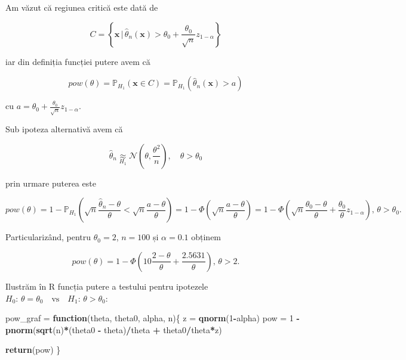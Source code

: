 \documentclass[]{article}
\newenvironment{Shaded}{\begin{snugshade}}{\end{snugshade}}
\newcommand{\KeywordTok}[1]{\textcolor[rgb]{0.13,0.29,0.53}{\textbf{#1}}}
\newcommand{\DecValTok}[1]{\textcolor[rgb]{0.00,0.00,0.81}{#1}}
\newcommand{\StringTok}[1]{\textcolor[rgb]{0.31,0.60,0.02}{#1}}
\newcommand{\ControlFlowTok}[1]{\textcolor[rgb]{0.13,0.29,0.53}{\textbf{#1}}}
\newcommand{\OperatorTok}[1]{\textcolor[rgb]{0.81,0.36,0.00}{\textbf{#1}}}
\newcommand{\NormalTok}[1]{#1}
\begin{document}
Am văzut că regiunea critică este dată de

\[
 C = \left\{\mathbf{x}\,|\,\hat{\theta}_n(\mathbf{x}) > \theta_0 + \frac{\theta_0}{\sqrt{n}}z_{1-\alpha}\right\}
\]

iar din definiția funcției putere avem că

\[
 pow(\theta) = \mathbb{P}_{H_1}(\mathbf{x}\in C) = \mathbb{P}_{H_1}(\hat{\theta}_n(\mathbf{x}) > a)
\]

cu \(a = \theta_0 + \frac{\theta_0}{\sqrt{n}}z_{1-\alpha}\).

Sub ipoteza alternativă avem că

\[
  \hat{\theta}_n \underset{H_1}{\approx} \mathcal{N}\left(\theta, \frac{\theta^2}{n}\right),\quad \theta>\theta_0
\]

prin urmare puterea este

\[
  pow(\theta) = 1 - \mathbb{P}_{H_1}\left(\sqrt{n}\frac{\hat{\theta}_n - \theta}{\theta}<\sqrt{n}\frac{a - \theta}{\theta}\right) = 1 - \Phi\left(\sqrt{n}\frac{a - \theta}{\theta}\right) = 1 - \Phi\left(\sqrt{n}\frac{\theta_0 - \theta}{\theta} + \frac{\theta_0}{\theta}z_{1-\alpha}\right),\, \theta>\theta_0.
\]

Particularizând, pentru \(\theta_0 = 2\), \(n = 100\) și
\(\alpha = 0.1\) obținem

\[
  pow(\theta) = 1 - \Phi\left(10\frac{2 - \theta}{\theta} + \frac{2.5631}{\theta}\right),\, \theta>2.
\]

Ilustrăm în R funcția putere a testului pentru ipotezele
\(H_0:\, \theta = \theta_0 \quad \text{vs}\quad H_1:\, \theta > \theta_0\):

\begin{Shaded}
\begin{Highlighting}[]
\NormalTok{pow_graf =}\StringTok{ }\ControlFlowTok{function}\NormalTok{(theta, theta0, alpha, n)\{}
\NormalTok{  z =}\StringTok{ }\KeywordTok{qnorm}\NormalTok{(}\DecValTok{1}\OperatorTok{-}\NormalTok{alpha)}
\NormalTok{  pow =}\StringTok{ }\DecValTok{1} \OperatorTok{-}\StringTok{ }\KeywordTok{pnorm}\NormalTok{(}\KeywordTok{sqrt}\NormalTok{(n)}\OperatorTok{*}\NormalTok{(theta0 }\OperatorTok{-}\StringTok{ }\NormalTok{theta)}\OperatorTok{/}\NormalTok{theta }\OperatorTok{+}\StringTok{ }\NormalTok{theta0}\OperatorTok{/}\NormalTok{theta}\OperatorTok{*}\NormalTok{z)}
  
  \KeywordTok{return}\NormalTok{(pow)}
\NormalTok{\}}
\end{Highlighting}
\end{Shaded}
\end{document}
